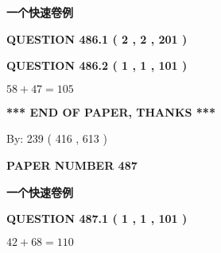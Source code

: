 \documentclass{ctexart}
\begin{document}
   
   
   
 \vspace{0.2in}
{\LARGE {\textbf{ 一个快速卷例}}}
   
   
  
\vspace{0.2in}
  
{\textbf{\Large{QUESTION
486.1 
 ( 2 , 2 , 201 )
}}}
  
  
  
\vspace{0.2in}
  
{\textbf{\Large{QUESTION
486.2 
 ( 1 , 1 , 101 )
}}}
  
  
 
 

$ %
58 +  %
47=   %
105$
 
 
   
   
 \vspace{0.2in}
 
   
   
   
   
\vspace{1.0in} 
{\textbf{\large{ *** END OF PAPER, THANKS *** }}} 
   
   
\hspace{1.0in} By: 
 239 ( 416 ,  613 )
   
   
   
   
\newpage 
\setcounter{page}{ 
   487001 } 
   
   
   
   
 {\textbf{ \Large{ PAPER NUMBER  487  }}}
   
   
\vspace{0.2in}
   
   
   
   
   
   
 \vspace{0.2in}
{\LARGE {\textbf{ 一个快速卷例}}}
   
   
  
\vspace{0.2in}
  
{\textbf{\Large{QUESTION
487.1 
 ( 1 , 1 , 101 )
}}}
  
  
 
 

$ %
42 +  %
68=   %
110$
 
 
  
\vspace{0.2in}
  
\end{document}
